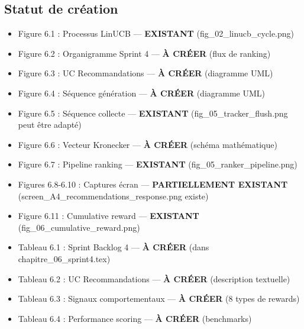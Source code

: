 \documentclass[12pt,a4paper]{article}
\begin{document}
\subsection*{Statut de création}

\begin{itemize}
    \item[\textcolor{green}{\checkmark}] Figure 6.1 : Processus LinUCB — \textbf{EXISTANT} (fig\_02\_linucb\_cycle.png)
    \item[\textcolor{green}{\checkmark}] Figure 6.2 : Organigramme Sprint 4 — \textbf{À CRÉER} (flux de ranking)
    \item[\textcolor{green}{\checkmark}] Figure 6.3 : UC Recommandations — \textbf{À CRÉER} (diagramme UML)
    \item[\textcolor{green}{\checkmark}] Figure 6.4 : Séquence génération — \textbf{À CRÉER} (diagramme UML)
    \item[\textcolor{green}{\checkmark}] Figure 6.5 : Séquence collecte — \textbf{EXISTANT} (fig\_05\_tracker\_flush.png peut être adapté)
    \item[\textcolor{green}{\checkmark}] Figure 6.6 : Vecteur Kronecker — \textbf{À CRÉER} (schéma mathématique)
    \item[\textcolor{green}{\checkmark}] Figure 6.7 : Pipeline ranking — \textbf{EXISTANT} (fig\_05\_ranker\_pipeline.png)
    \item[\textcolor{orange}{!}] Figures 6.8-6.10 : Captures écran — \textbf{PARTIELLEMENT EXISTANT} (screen\_A4\_recommendations\_response.png existe)
    \item[\textcolor{green}{\checkmark}] Figure 6.11 : Cumulative reward — \textbf{EXISTANT} (fig\_06\_cumulative\_reward.png)
    
    \item[\textcolor{green}{\checkmark}] Tableau 6.1 : Sprint Backlog 4 — \textbf{À CRÉER} (dans chapitre\_06\_sprint4.tex)
    \item[\textcolor{green}{\checkmark}] Tableau 6.2 : UC Recommandations — \textbf{À CRÉER} (description textuelle)
    \item[\textcolor{green}{\checkmark}] Tableau 6.3 : Signaux comportementaux — \textbf{À CRÉER} (8 types de rewards)
    \item[\textcolor{green}{\checkmark}] Tableau 6.4 : Performance scoring — \textbf{À CRÉER} (benchmarks)
\end{itemize}


\end{document}
